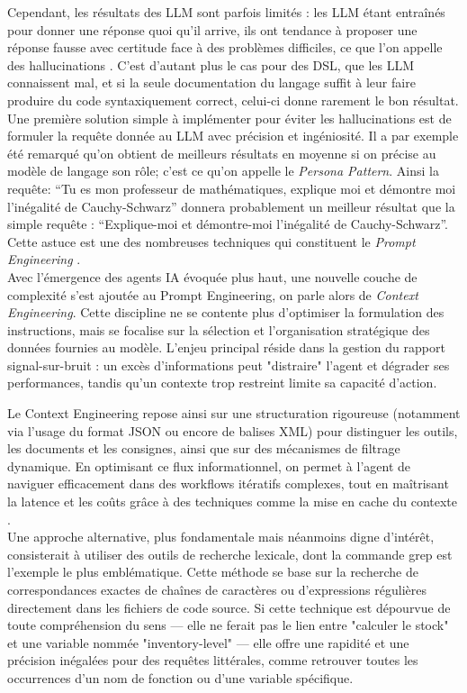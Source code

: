 Cependant, les résultats des LLM sont parfois limités : les LLM étant entraînés pour donner une réponse quoi qu’il arrive, ils ont tendance à proposer une réponse fausse avec certitude face à des problèmes difficiles, ce que l’on appelle des hallucinations \cite{Tauman2025}. C’est d’autant plus le cas pour des DSL, que les LLM connaissent mal, et si la seule documentation du langage suffit à leur faire produire du code syntaxiquement correct, celui-ci donne rarement le bon résultat.
\\

Une première solution simple à implémenter pour éviter les hallucinations est de formuler la requête donnée au LLM avec précision et ingéniosité. Il a par exemple été remarqué qu’on obtient de meilleurs résultats en moyenne si on précise au modèle de langage son rôle; c’est ce qu’on appelle le \textit{Persona Pattern}. Ainsi la requête: “Tu es mon professeur de mathématiques, explique moi et démontre moi l’inégalité de Cauchy-Schwarz” donnera probablement un meilleur résultat que la simple requête : “Explique-moi et démontre-moi l’inégalité de Cauchy-Schwarz”. Cette astuce est une des nombreuses techniques qui constituent le \textit{Prompt Engineering} \cite{White2023}.
\\

Avec l’émergence des agents IA évoquée plus haut, une nouvelle couche de complexité s’est ajoutée au Prompt Engineering, on parle alors de \textit{Context Engineering}. Cette discipline ne se contente plus d'optimiser la formulation des instructions, mais se focalise sur la sélection et l'organisation stratégique des données fournies au modèle. L'enjeu principal réside dans la gestion du rapport signal-sur-bruit : un excès d'informations peut "distraire" l'agent et dégrader ses performances, tandis qu'un contexte trop restreint limite sa capacité d'action. 

Le Context Engineering repose ainsi sur une structuration rigoureuse (notamment via l'usage du format JSON ou encore de balises XML) pour distinguer les outils, les documents et les consignes, ainsi que sur des mécanismes de filtrage dynamique. En optimisant ce flux informationnel, on permet à l'agent de naviguer efficacement dans des workflows itératifs complexes, tout en maîtrisant la latence et les coûts grâce à des techniques comme la mise en cache du contexte \cite{Anthropic2025}. 
\\

Une approche alternative, plus fondamentale mais néanmoins digne d'intérêt, consisterait à utiliser des outils de recherche lexicale, dont la commande grep est l'exemple le plus emblématique. Cette méthode se base sur la recherche de correspondances exactes de chaînes de caractères ou d'expressions régulières directement dans les fichiers de code source. Si cette technique est dépourvue de toute compréhension du sens — elle ne ferait pas le lien entre "calculer le stock" et une variable nommée "inventory-level" — elle offre une rapidité et une précision inégalées pour des requêtes littérales, comme retrouver toutes les occurrences d'un nom de fonction ou d'une variable spécifique.
\\

